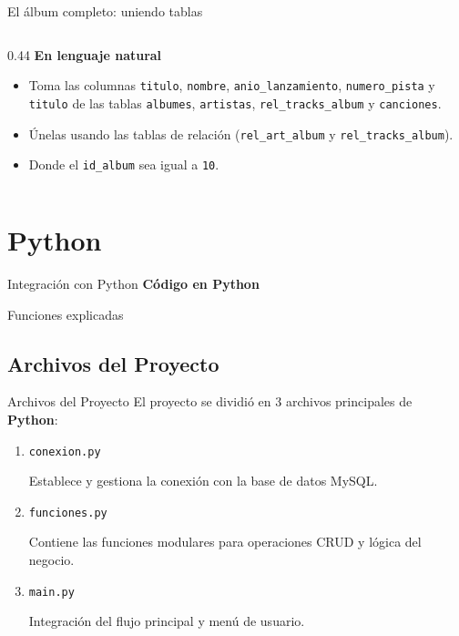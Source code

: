\documentclass[aspectratio=169, 10pt]{beamer}
\begin{document}
\begin{frame}[t,fragile]{El álbum completo: uniendo tablas}
\begin{columns}[T]
        \begin{column}{0.44\textwidth}
            \textbf{En lenguaje natural}
            \begin{itemize}
                \setlength{\itemsep}{2pt}
                \item Toma las columnas \texttt{titulo}, \texttt{nombre},
                \texttt{anio\_lanzamiento}, \texttt{numero\_pista} y
                \texttt{titulo} de las tablas \texttt{albumes},
                \texttt{artistas}, \texttt{rel\_tracks\_album} y
                \texttt{canciones}.
                \item Únelas usando las tablas de relación
                (\texttt{rel\_art\_album} y \texttt{rel\_tracks\_album}).
                \item Donde el \texttt{id\_album} sea igual a \texttt{10}.
            \end{itemize}
        \end{column}
    \end{columns}
\end{frame}
\section{Python}

\begin{frame}{Integración con Python}
	\centering
	\vfill
	{\Huge \textbf{Código en Python}}\par\vspace{0.4cm}
	{\Huge Funciones explicadas}
	\vfill
\end{frame}

\subsection{Archivos del Proyecto}
\begin{frame}{Archivos del Proyecto}
	El proyecto se dividió en 3 archivos principales de \textbf{Python}:
	\vspace{0.3cm}
	\begin{enumerate}
		\setlength{\itemsep}{8pt}
		\item \texttt{conexion.py}\par
		Establece y gestiona la conexión con la base de datos MySQL.
		\item \texttt{funciones.py}\par
		Contiene las funciones modulares para operaciones CRUD y lógica del negocio.
		\item \texttt{main.py}\par
		Integración del flujo principal y menú de usuario.
	\end{enumerate}
\end{frame}
\end{document}
